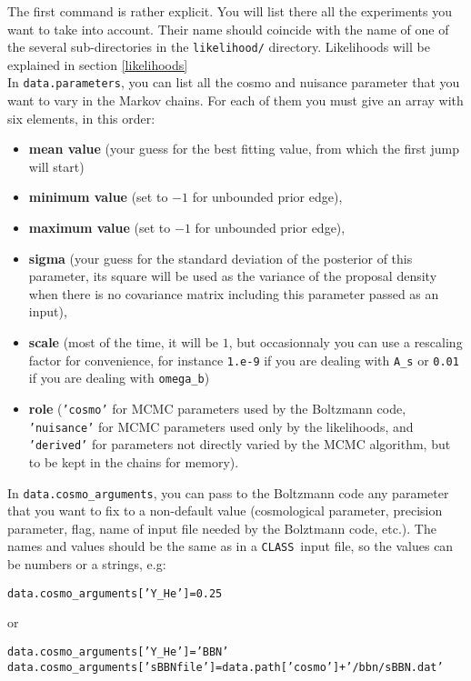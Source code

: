 \documentclass[10pt]{article}
\newcommand{\CLASS}{\texttt{CLASS}}
\begin{document}
  The first command is rather explicit. You will list there all the experiments
  you want to take into account. Their name should coincide with the name of one of the several sub-directories in the \verb?likelihood/? directory. Likelihoods will be explained in section \ref{likelihoods}\\

  In \verb?data.parameters?, you can list all the cosmo and nuisance parameter that you
  want to vary in the Markov chains. For each of them you must give an array
  with six elements, in this order: 
  \begin{itemize}
    \item {\bf mean value} (your guess for the best fitting value, from which the first jump will start)
    \item {\bf minimum value} (set to $-1$ for unbounded prior edge), 
    \item {\bf maximum value} (set to $-1$ for unbounded prior edge), 
    \item {\bf sigma} (your guess for the standard deviation of the posterior of this parameter, its square will be used as the variance of the proposal density when there is no covariance matrix including this parameter passed as an input),
    \item {\bf scale} (most of the time, it will be $1$, but occasionnaly you can use a rescaling factor for convenience, for instance {\tt 1.e-9} if you are dealing with \verb?A_s? or \verb?0.01? if you are dealing with \verb?omega_b?) 
    \item {\bf role} ({\tt 'cosmo'} for MCMC parameters used by the Boltzmann code, {\tt 'nuisance'} for MCMC parameters used only by the likelihoods, and {\tt 'derived'} for parameters not directly varied by the MCMC algorithm, but to be kept in the chains for memory).
      \end{itemize}
  
  In  \verb?data.cosmo_arguments?, you can pass to the Boltzmann code any parameter that you want to fix to a non-default value (cosmological parameter, precision parameter, flag, name of input file needed by the Bolztmann code, etc.). The names and values should be the same as in a \CLASS~input file, so the values can be numbers or a strings, e.g:
  \begin{alltt}
    data.cosmo_arguments['Y_He']           = 0.25
    \end{alltt}  
    or
  \begin{alltt}
    data.cosmo_arguments['Y_He']           = 'BBN'    
    data.cosmo_arguments['sBBN file'] = data.path['cosmo']+'/bbn/sBBN.dat'
    \end{alltt}
  
\end{document}
